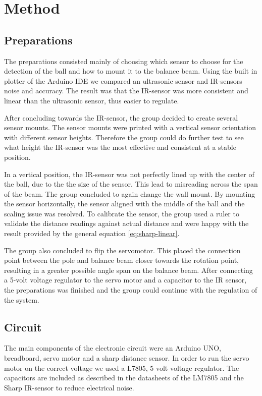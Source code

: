 \section{Method}
\subsection{Preparations}

The preparations consisted mainly of choosing which sensor to choose for the detection of the ball and how to mount it to the balance beam. Using the built in plotter of the Arduino IDE we compared an ultrasonic sensor and IR-sensors noise and accuracy. The result was that the IR-sensor was more consistent and linear than the ultrasonic sensor, thus easier to regulate.

After concluding towards the IR-sensor, the group decided to create several sensor mounts. The sensor mounts were printed with a vertical sensor orientation with different sensor heights. Therefore the group could do further test to see what height the IR-sensor was the most effective and consistent at a stable position. 

In a vertical position, the IR-sensor was not perfectly lined up with the center of the ball, due to the the size of the sensor. This lead to misreading across the span of the beam. The group concluded to again change the wall mount. By mounting the sensor horizontally, the sensor aligned with the middle of the ball and the scaling issue was resolved. To calibrate the sensor, the group used a ruler to validate the distance readings against actual distance and were happy with the result provided by the general equation \ref{eq:sharp-linear}.

The group also concluded to flip the servomotor. This placed the connection point between the pole and balance beam closer towards the rotation point, resulting in a greater possible angle span on the balance beam. After connecting a 5-volt voltage regulator to the servo motor and a capacitor to the IR sensor, the preparations was finished and the group could continue with the regulation of the system. 
\subsection{Circuit}
The main components of the electronic circuit were an Arduino UNO, breadboard, servo motor and a sharp distance sensor. In order to run the servo motor on the correct voltage we used a L7805, 5 volt voltage regulator. The capacitors are included as described in the datasheets of the LM7805 \cite{LM78XX-datasheet} and the Sharp IR-sensor \cite{Sharp-datasheet} to reduce electrical noise.

